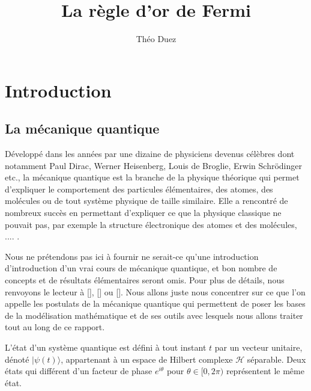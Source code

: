 \documentclass[12pt,openany,a4paper, titlepage]{article}
\title{La règle d'or de Fermi}
\author{Théo Duez }
\newcommand{\HH}{\mathcal{H}}
\theoremstyle{definition}
\theoremstyle{definition}
\theoremstyle{definition}
\theoremstyle{definition}
\theoremstyle{definition}
\theoremstyle{definition}
\begin{document}
\maketitle

\newpage

\tableofcontents

\newpage

\section{Introduction}

\subsection{La mécanique quantique}

Développé dans les années par une dizaine de physiciens devenus célèbres dont notamment Paul Dirac, Werner Heisenberg, Louis de Broglie, Erwin Schrödinger etc.,  la mécanique quantique est la branche de la physique théorique qui permet d'expliquer le comportement des particules élémentaires, des atomes, des molécules ou de tout système physique de taille similaire. Elle a rencontré de nombreux succès en permettant d'expliquer ce que la physique classique ne pouvait pas, par exemple la structure électronique des atomes et des molécules, .... . 

Nous ne prétendons pas ici à fournir ne serait-ce qu'une introduction d'introduction d'un vrai cours de mécanique quantique, et bon nombre de concepts et de résultats élémentaires seront omis. Pour plus de détails, nous renvoyons le lecteur à [], [] ou []. Nous allons juste nous concentrer sur ce que l'on appelle les postulats de la mécanique quantique qui permettent de poser les bases de la modélisation mathématique et de ses outils avec lesquels nous allons traiter tout au long de ce rapport.

\vspace{3mm}
\begin{tcolorbox}[colback=gray!5!white,
                  colframe=gray!80!white,
                  title= Postulat 1 : Principe de superposition ]
L'état d'un système quantique est défini à tout instant $t$ par un vecteur unitaire, dénoté $|\psi(t)\rangle$, appartenant à un espace de Hilbert complexe $\HH$ séparable. Deux états qui différent d'un facteur de phase $e^{i\theta}$ pour $\theta\in[0,2\pi)$ représentent le même état.
\end{tcolorbox}
\vspace{3mm}
\end{document}
